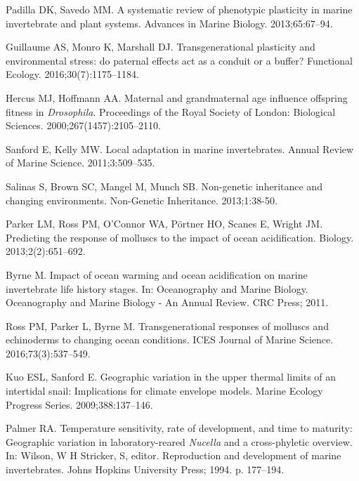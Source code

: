 \documentclass[10pt,letterpaper]{article}
\begin{document}
\begin{thebibliography}{10}
Padilla DK, Savedo MM.
\newblock A systematic review of phenotypic plasticity in marine invertebrate
  and plant systems.
\newblock Advances in Marine Biology. 2013;65:67--94.

Guillaume AS, Monro K, Marshall DJ.
\newblock Transgenerational plasticity and environmental stress: do paternal
  effects act as a conduit or a buffer?
\newblock Functional Ecology. 2016;30(7):1175--1184.

Hercus MJ, Hoffmann AA.
\newblock Maternal and grandmaternal age influence offspring fitness in
  \textit{Drosophila}.
\newblock Proceedings of the Royal Society of London: Biological Sciences. 2000;267(1457):2105--2110.

Sanford E, Kelly MW.
\newblock Local adaptation in marine invertebrates.
\newblock Annual Review of Marine Science. 2011;3:509--535.

Salinas S, Brown SC, Mangel M, Munch SB.
\newblock Non-genetic inheritance and changing environments.
\newblock Non-Genetic Inheritance. 2013;1:38-50.

Parker LM, Ross PM, O'Connor WA, P{\"o}rtner HO, Scanes E, Wright JM.
\newblock Predicting the response of molluscs to the impact of ocean
  acidification.
\newblock Biology. 2013;2(2):651--692.

Byrne M.
\newblock Impact of ocean warming and ocean acidification on marine
  invertebrate life history stages.
\newblock In: Oceanography and Marine Biology. Oceanography and Marine Biology
  - An Annual Review. CRC Press; 2011.

Ross PM, Parker L, Byrne M.
\newblock Transgenerational responses of molluscs and echinoderms to changing
  ocean conditions.
\newblock ICES Journal of Marine Science. 2016;73(3):537--549.

Kuo ESL, Sanford E.
\newblock Geographic variation in the upper thermal limits of an intertidal
  snail: Implications for climate envelope models.
\newblock Marine Ecology Progress Series. 2009;388:137--146.

Palmer RA.
\newblock Temperature sensitivity, rate of development, and time to maturity:
  Geographic variation in laboratory-reared \textit{Nucella} and a
  cross-phyletic overview.
\newblock In: {Wilson, W H Stricker, S}, editor. Reproduction and development
  of marine invertebrates. Johns Hopkins University Press; 1994. p. 177--194.


\end{thebibliography}
\end{document}
